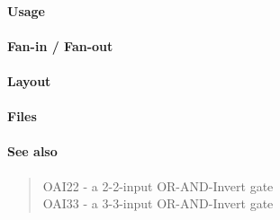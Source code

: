 \paragraph{Usage}

\paragraph{Fan-in / Fan-out}

\paragraph{Layout}

\paragraph{Files}

\paragraph{See also}
\begin{quote}
    OAI22 - a 2-2-input OR-AND-Invert gate \\
    OAI33 - a 3-3-input OR-AND-Invert gate
\end{quote}
